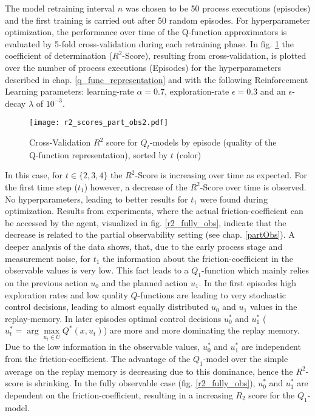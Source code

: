 The model retraining interval $n$ was chosen to be 50 process executions (episodes) and the first training is carried out after 50 random episodes. For hyperparameter optimization, the performance over time of the Q-function approximators is evaluated by 5-fold cross-validation during each retraining phase. In fig. \ref{r2_scores} the coefficient of determination ($R^2$-Score), resulting from cross-validation, is plotted over the number of process executions (Episodes) for the hyperparameters described in chap. \ref{q_func_representation} and with the following Reinforcement Learning parameters: learning-rate $\alpha=0.7$, exploration-rate $\epsilon=0.3$ and an $\epsilon$-decay $\lambda$ of $10^{-3}$. 

\begin{figure}
	\texttt{[image: r2\_scores\_part\_obs2.pdf]}
	\caption{Cross-Validation $R^2$ score for $Q_t$-models by episode (quality of the Q-function representation), sorted by $t$ (color)}
	\label{r2_scores}
\end{figure}

In this case, for $t\in\{2,3,4\}$ the $R^2$-Score is increasing over time as expected. For the first time step ($t_1$) however, a decrease of the $R^2$-Score over time is observed. No hyperparameters, leading to better results for $t_1$ were found during optimization. Results from experiments, where the actual friction-coefficient can be accessed by the agent, visualized in fig. \ref{r2_fully_obs}, indicate that the decrease is related to the partial observability setting (see chap. \ref{partObs}). A deeper analysis of the data shows, that, due to the early process stage and measurement noise, for $t_1$ the information about the friction-coefficient in the observable values is very low. This fact leads to a $Q_1$-function which mainly relies on the previous action $u_0$ and the planned action $u_1$. In the first episodes high exploration rates and low quality $Q$-functions are leading to very stochastic control decisions, leading to almost equally distributed $u_0$ and $u_1$ values in the replay-memory. In later episodes optimal control decisions $u_0^*$ and $u_1^*$ ($u_t^*=\arg\max\limits_{u_t\in U}Q^*(x,u_t)$) are more and more dominating the replay memory. Due to the low information in the observable values, $u_0^*$ and $u_1^*$ are independent from the friction-coefficient. The advantage of the $Q_1$-model over the simple average on the replay memory is decreasing due to this dominance, hence the $R^2$-score is shrinking. In the fully observable case (fig. \ref{r2_fully_obs}), $u_0^*$ and $u_1^*$ are dependent on the friction-coefficient, resulting in a increasing $R_2$ score for the $Q_1$-model.


